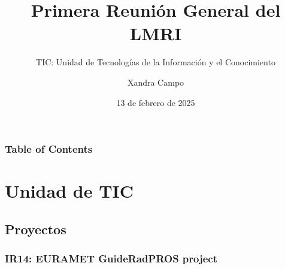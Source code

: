 \documentclass{beamer}
\title{Primera Reunión General del LMRI}
\subtitle{TIC: Unidad de Tecnologías de la Información y el Conocimiento}
\author[X. Campo]{Xandra Campo}
\institute[LMRI-CIEMAT]{Laboratorio de Metrología de Radiaciones Ionizantes (LMRI) \newline CIEMAT}
\date{13 de febrero de 2025}<
\begin{document}
	\maketitle

	\begin{frame}
		\frametitle{Table of Contents}
		\tableofcontents
	\end{frame}

	\section{Unidad de TIC}

	\subsection{Proyectos}

	\subsubsection{IR14: EURAMET GuideRadPROS project}
\end{document}
